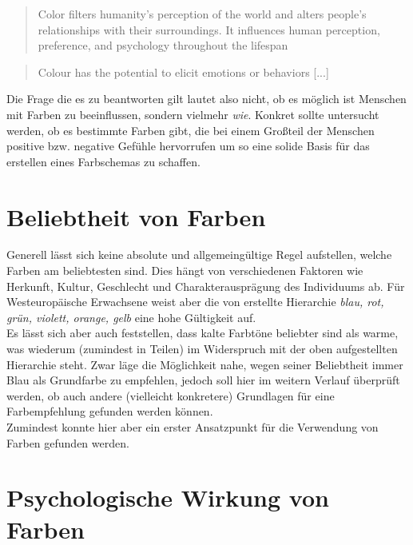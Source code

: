 \begin{quote}
Color filters humanity’s perception of the world and alters people’s relationships with their surroundings. It influences human perception, preference, and psychology throughout the lifespan \cite{cyr2010colour}
\end{quote}

\begin{quote}
Colour has the potential to elicit emotions or behaviors [...] \cite{rider2010color}
\end{quote}

Die Frage die es zu beantworten gilt lautet also nicht, ob es möglich ist Menschen mit Farben zu beeinflussen, sondern vielmehr \textit{wie}. Konkret sollte untersucht werden, ob es bestimmte Farben gibt, die bei einem Großteil der Menschen positive bzw. negative Gefühle hervorrufen um so eine solide Basis für das erstellen eines Farbschemas zu schaffen.


\section{Beliebtheit von Farben}

Generell lässt sich keine absolute und allgemeingültige Regel aufstellen, welche Farben am beliebtesten sind. Dies hängt von verschiedenen Faktoren wie Herkunft, Kultur, Geschlecht und Charakterausprägung des Individuums ab. Für Westeuropäische Erwachsene weist aber die von \cite{eysenck1941critical} erstellte Hierarchie \textit{blau, rot, grün, violett, orange, gelb} eine hohe Gültigkeit auf. \\
Es lässt sich aber auch feststellen, dass kalte Farbtöne beliebter sind als warme, was wiederum (zumindest in Teilen) im Widerspruch mit der oben aufgestellten Hierarchie steht. 
Zwar läge die Möglichkeit nahe, wegen seiner Beliebtheit immer Blau als Grundfarbe zu empfehlen, jedoch soll hier im weitern Verlauf überprüft werden, ob auch andere (vielleicht konkretere) Grundlagen für eine Farbempfehlung gefunden werden können. \\
Zumindest konnte hier aber ein erster Ansatzpunkt für die Verwendung von Farben gefunden werden.



\section{Psychologische Wirkung von Farben}

